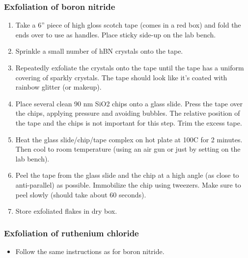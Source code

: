 \begin{appendices}
\subsubsection{Exfoliation of boron nitride}
\begin{enumerate}	
	\item Take a 6” piece of high gloss scotch tape (comes in a red box) and fold the ends over to use as handles. Place sticky side-up on the lab bench.
	\item Sprinkle a small number of hBN crystals onto the tape.
	\item Repeatedly exfoliate the crystals onto the tape until the tape has a uniform covering of sparkly crystals. The tape should look like it’s coated with rainbow glitter (or makeup).
	\item Place several clean 90 nm SiO2 chips onto a glass slide. Press the tape over the chips, applying pressure and avoiding bubbles. The relative position of the tape and the chips is not important for this step. Trim the excess tape.
	\item Heat the glass slide/chip/tape complex on hot plate at 100C for 2 minutes. Then cool to room temperature (using an air gun or just by setting on the lab bench).
	\item Peel the tape from the glass slide and the chip at a high angle (as close to anti-parallel) as possible. Immobilize the chip using tweezers. Make sure to peel slowly (should take about 60 seconds).
	\item Store exfoliated flakes in dry box.
\end{enumerate}

\subsubsection{Exfoliation of ruthenium chloride}
\begin{itemize}
	\item Follow the same instructions as for boron nitride.
\end{itemize}


\end{appendices}
